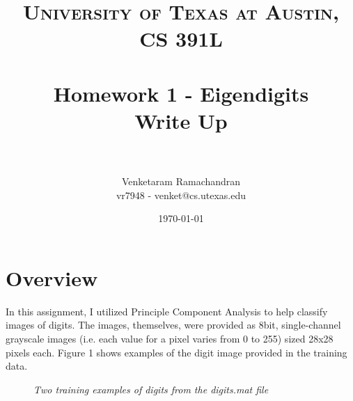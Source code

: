 \documentclass{article} %
\title{	
\normalfont \normalsize 
\textsc{University of Texas at Austin, CS 391L} \\
\horrule{0.6pt} \\[0.4cm] %
\huge Homework 1 - Eigendigits \\[0.4cm]
\large Write Up  \\
\horrule{2pt} \\[0.5cm] %
}
\author{Venketaram Ramachandran\\
vr7948 - venket@cs.utexas.edu} %
\date{\normalsize\today} %
\begin{document}
\maketitle %

\section{Overview}

In this assignment, I utilized Principle Component Analysis to help classify images of digits. The images, themselves, were provided as 8bit, single-channel grayscale images (i.e. each value for a pixel varies from 0 to 255) sized 28x28 pixels each. Figure 1 shows examples of the digit image provided in the training data.

\begin{figure}[h]%
	\centering
    	\hfill%
    \caption{\textit{Two training examples of digits from the digits.mat file}}
    \label{fig:default}
\end{figure}
\end{document}
